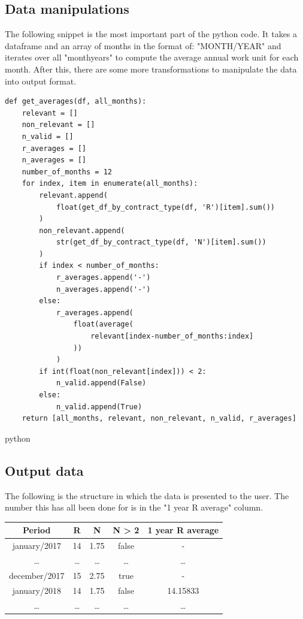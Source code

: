\documentclass[12pt,oneside]{fithesis2}
\begin{document}
\subsection{Data manipulations}
The following snippet is the most important part of the python code. It takes a dataframe and an array of months in the format of: "MONTH/YEAR" and iterates over all "monthyears" to compute the average annual work unit for each month. After this, there are some more transformations to manipulate the data into output format.

\begin{verbatim}
def get_averages(df, all_months):
    relevant = []
    non_relevant = []
    n_valid = []
    r_averages = []
    n_averages = []
    number_of_months = 12
    for index, item in enumerate(all_months):
        relevant.append(
            float(get_df_by_contract_type(df, 'R')[item].sum())
        )
        non_relevant.append(
            str(get_df_by_contract_type(df, 'N')[item].sum())
        )
        if index < number_of_months:
            r_averages.append('-')
            n_averages.append('-')
        else:
            r_averages.append(
                float(average(
                    relevant[index-number_of_months:index]
                ))
            )
        if int(float(non_relevant[index])) < 2:
            n_valid.append(False)
        else:
            n_valid.append(True)
    return [all_months, relevant, non_relevant, n_valid, r_averages]
\end{verbatim}{python}

\subsection{Output data}
The following is the structure in which the data is presented to the user. The number this has all been done for is in the "1 year R average" column.
\begin{center}
\begin{tabular}{ |c|c|c|c|c| } 
\hline
Period & R & N & N > 2 & 1 year R average \\
\hline
january/2017 & 14 & 1.75 & false & - \\
\dots & \dots & \dots & \dots & \dots \\
december/2017 & 15 & 2.75 & true & - \\
january/2018 & 14 & 1.75 & false & 14.15833 \\
\dots & \dots & \dots & \dots & \dots \\
\hline
\end{tabular}
\end{center}
\end{document}
